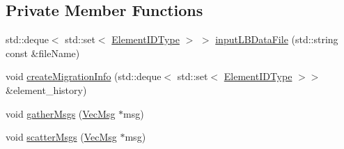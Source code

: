 \subsection*{Private Member Functions}
\begin{DoxyCompactItemize}
\item 
std\+::deque$<$ std\+::set$<$ \hyperlink{namespacevt_1_1vrt_1_1collection_1_1balance_a592736f733df4f90856df90a1fd08905}{Element\+I\+D\+Type} $>$ $>$ \hyperlink{structvt_1_1vrt_1_1collection_1_1balance_1_1_l_b_data_restart_reader_a29460c45d0cac9b53d8b4d8c83113752}{input\+L\+B\+Data\+File} (std\+::string const \&file\+Name)
\item 
void \hyperlink{structvt_1_1vrt_1_1collection_1_1balance_1_1_l_b_data_restart_reader_aa9ebf70f66a044a5f90ee2264ed60312}{create\+Migration\+Info} (std\+::deque$<$ std\+::set$<$ \hyperlink{namespacevt_1_1vrt_1_1collection_1_1balance_a592736f733df4f90856df90a1fd08905}{Element\+I\+D\+Type} $>$$>$ \&element\+\_\+history)
\item 
void \hyperlink{structvt_1_1vrt_1_1collection_1_1balance_1_1_l_b_data_restart_reader_ace286aca1c6d3fa448c27eda15750444}{gather\+Msgs} (\hyperlink{structvt_1_1vrt_1_1collection_1_1balance_1_1_l_b_data_restart_reader_ad48bf75b314df0ec9dbcf5c274fef246}{Vec\+Msg} $\ast$msg)
\item 
void \hyperlink{structvt_1_1vrt_1_1collection_1_1balance_1_1_l_b_data_restart_reader_ac6b1881a1cdd29fdefa70b8cc131ae17}{scatter\+Msgs} (\hyperlink{structvt_1_1vrt_1_1collection_1_1balance_1_1_l_b_data_restart_reader_ad48bf75b314df0ec9dbcf5c274fef246}{Vec\+Msg} $\ast$msg)
\end{DoxyCompactItemize}
